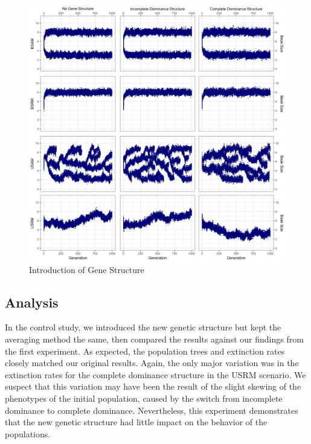\documentclass[conference]{IEEEtran}
\begin{document}
\begin{figure}
    \centering
    \includegraphics[width=\linewidth]{DATA_JPG/EXP2}
    \caption{Introduction of Gene Structure}
    \label{fig:EXP2}
\end{figure}

\subsection{Analysis}

In the control study, we introduced the new genetic structure but kept the averaging method the same, then compared the results against our findings from the first experiment. As expected, the population trees and extinction rates closely matched our original results. Again, the only major variation was in the extinction rates for the complete dominance structure in the USRM scenario. We suspect that this variation may have been the result of the slight skewing of the phenotypes of the initial population, caused by the switch from incomplete dominance to complete dominance. Nevertheless, this experiment demonstrates that the new genetic structure had little impact on the behavior of the populations.
\end{document}
